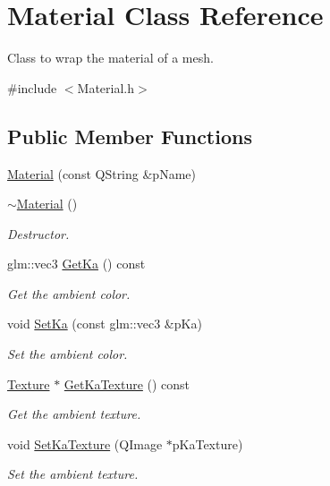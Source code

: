 \hypertarget{class_material}{\section{Material Class Reference}
\label{class_material}
}


Class to wrap the material of a mesh.  




{\ttfamily \#include $<$Material.\+h$>$}

\subsection*{Public Member Functions}
\begin{DoxyCompactItemize}
\item 
\hyperlink{class_material_af00a0253758e55236b0b785d52be5eca}{Material} (const Q\+String \&p\+Name)
\item 
\hyperlink{class_material_a2c19452d71f54075df8f5405b03129f4}{$\sim$\+Material} ()
\begin{DoxyCompactList}\small\item\em Destructor. \end{DoxyCompactList}\item 
glm\+::vec3 \hyperlink{class_material_a895619e596a37ec4680a7b50b541c1c7}{Get\+Ka} () const 
\begin{DoxyCompactList}\small\item\em Get the ambient color. \end{DoxyCompactList}\item 
void \hyperlink{class_material_a99aefaa6bf97c2508c31f5fe070571b1}{Set\+Ka} (const glm\+::vec3 \&p\+Ka)
\begin{DoxyCompactList}\small\item\em Set the ambient color. \end{DoxyCompactList}\item 
\hyperlink{class_texture}{Texture} $\ast$ \hyperlink{class_material_a9c21739bc0fb0357faf011dbc2687c69}{Get\+Ka\+Texture} () const 
\begin{DoxyCompactList}\small\item\em Get the ambient texture. \end{DoxyCompactList}\item 
void \hyperlink{class_material_a2aa0dd91072d6afe0f80af70a1764434}{Set\+Ka\+Texture} (Q\+Image $\ast$p\+Ka\+Texture)
\begin{DoxyCompactList}\small\item\em Set the ambient texture. \end{DoxyCompactList}\item 

\end{DoxyCompactItemize}
